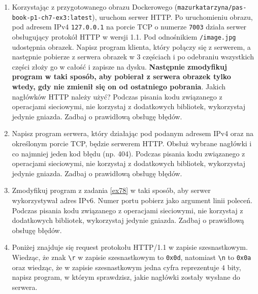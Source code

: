 \documentclass{article}
\begin{document}
\begin{enumerate}[label=\textbf{7.\arabic*}]

\item Korzystając z przygotowanego obrazu Dockerowego (\texttt{mazurkatarzyna/pas-book-p1-ch7-ex3:latest}), uruchom serwer HTTP.  Po uruchomieniu obrazu, pod adresem IPv4 \texttt{127.0.0.1} na porcie TCP o numerze \texttt{7003} działa serwer obsługujący protokół HTTP w wersji 1.1. Pod odnośnikiem \texttt{/image.jpg} udostępnia obrazek. Napisz program klienta, który połączy się
z serwerem, a następnie pobierze z serwera obrazek w 3 częściach i po odebraniu wszystkich części złoży go w całość i zapisze na dysku. \textbf{Następnie zmodyfikuj program   w taki sposób, aby pobierał z serwera obrazek tylko wtedy, gdy nie zmienił się on od ostatniego pobrania}. Jakich nagłówków HTTP należy użyć? Podczas pisania kodu związanego z operacjami sieciowymi, nie korzystaj z dodatkowych bibliotek, wykorzystaj jedynie gniazda. Zadbaj o prawidłową obsługę błędów.


\item \label{ex78} Napisz program serwera, który działając pod podanym adresem IPv4   oraz na określonym porcie TCP, będzie serwerem HTTP. Obsłuż wybrane nagłówki i co najmniej jeden kod błędu (np. 404).  Podczas pisania kodu związanego z operacjami sieciowymi, nie korzystaj z dodatkowych bibliotek, wykorzystaj jedynie gniazda. Zadbaj o prawidłową obsługę błędów.


\item  Zmodyfikuj program z zadania \ref{ex78} w taki sposób, aby serwer wykorzystywał adres IPv6.  Numer portu pobierz jako argument  linii poleceń. Podczas pisania kodu związanego z operacjami sieciowymi, nie korzystaj z dodatkowych bibliotek, wykorzystaj jedynie gniazda. Zadbaj o prawidłową obsługę błędów. 

\item Poniżej znajduje się request protokołu HTTP/1.1 w zapisie szesnastkowym. Wiedząc, że znak \texttt{\textbackslash r} w zapisie szesnastkowym to \texttt{0x0d}, natomiast \texttt{\textbackslash n} to \texttt{0x0a} oraz wiedząc, że w zapisie szesnastkowym jedna cyfra reprezentuje $4$ bity, napisz program, w którym sprawdzisz, jakie nagłówki zostały wysłane do serwera.


\end{enumerate}
\end{document}
